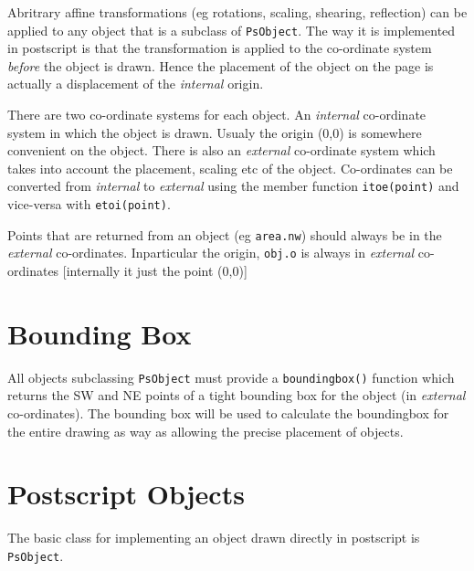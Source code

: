 \documentclass[a4paper]{book}
\begin{document}
Abritrary affine transformations (eg rotations, scaling, shearing,
reflection) can be applied to any object that is a subclass of 
\Verb|PsObject|. The way it is implemented in postscript is that the 
transformation is applied to the co-ordinate system \emph{before}
the object is drawn. Hence the placement of the object on the page
is actually a displacement of the \emph{internal} origin.

There are two co-ordinate systems for each object. An \emph{internal}
co-ordinate system in which the object is drawn. Usualy the origin (0,0) is
somewhere convenient on the object. There is also an \emph{external}
co-ordinate system which takes into account the placement, scaling etc of
the object. Co-ordinates can be converted from \emph{internal} to
\emph{external} using the member function \Verb|itoe(point)| and vice-versa
with \Verb|etoi(point)|.

Points that are returned from an object (eg \Verb|area.nw|) should
always be in the \emph{external} co-ordinates. Inparticular the origin,
\Verb|obj.o| is always in \emph{external} co-ordinates [internally it
just the point (0,0)]

\section{Bounding Box}
\label{sec:bounding-box}

All objects subclassing \Verb|PsObject| must provide a \Verb|boundingbox()|
function which returns the SW and NE points of a tight bounding box for the
object (in \emph{external} co-ordinates). The bounding box will be used
to calculate the boundingbox for the entire drawing as way as allowing
the precise placement of objects.


\section{Postscript Objects}
\label{sec:postscript-objects}

The basic class for implementing an object drawn directly in postscript
is \Verb|PsObject|. 

\appendix




\end{document}
